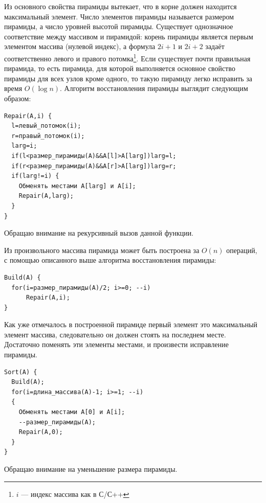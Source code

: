 \documentclass[12pt]{article}
\begin{document}
Из основного свойства пирамиды вытекает, что в корне должен находится максимальный элемент. Число элементов пирамиды
называется размером пирамиды, а число уровней высотой пирамиды. Существует однозначное соответствие между массивом и
пирамидой: корень пирамиды является первым элементом массива (нулевой индекс), а формула $ 2i+1 $ и $ 2i+2 $ задаёт
соответственно левого и правого потомка\footnote{$i$ — индекс массива как в С/С++}. Если существует почти правильная
пирамида, то есть пирамида, для которой выполняется основное свойство пирамиды для всех узлов кроме одного, то такую
пирамиду легко исправить за время $ O(\log{}n) $. Алгоритм восстановления пирамиды выглядит следующим образом:
\begin{verbatim}
Repair(A,i) {
  l=левый_потомок(i);
  r=правый_потомок(i);
  larg=i;
  if(l<размер_пирамиды(А)&&A[l]>A[larg])larg=l;
  if(r<размер_пирамиды(А)&&A[r]>A[larg])larg=r;
  if(larg!=i) {
    Обменять местами A[larg] и A[i];
    Repair(A,larg);
  }
}
\end{verbatim}
Обращаю внимание на рекурсивный вызов данной функции.

Из произвольного массива пирамида может быть построена за $ O(n) $ операций, с помощью описанного выше алгоритма
восстановления пирамиды:
\begin{verbatim}
Build(A) {
  for(i=размер_пирамиды(А)/2; i>=0; --i)
      Repair(A,i);
}
\end{verbatim}

Как уже отмечалось в построенной пирамиде первый элемент это максимальный элемент массива, следовательно он должен стоять на последнем месте. Достаточно поменять эти элементы местами, и произвести исправление пирамиды.
\begin{verbatim}
Sort(A) {
  Build(A);
  for(i=длина_массива(А)-1; i>=1; --i)
  {
    Обменять местами A[0] и A[i];
    --размер_пирамиды(А);
    Repair(A,0);
  }
}
\end{verbatim}
Обращаю внимание на уменьшение размера пирамиды.
\end{document}
